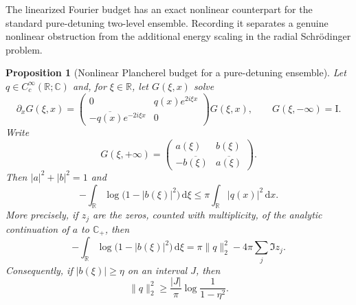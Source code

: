 \documentclass[11pt]{article}
\newcommand{\Id}{\mathrm I}
\newcommand{\dd}{\,\mathrm d}
\newtheorem{proposition}[theorem]{Proposition}
\theoremstyle{definition}
\theoremstyle{remark}
\begin{document}
The linearized Fourier budget has an exact nonlinear counterpart for the
standard pure-detuning two-level ensemble.  Recording it separates a genuine
nonlinear obstruction from the additional energy scaling in the radial
Schr\"odinger problem.

\begin{proposition}[Nonlinear Plancherel budget for a pure-detuning ensemble]
\label{prop:SU2-nonlinear-Plancherel}
Let $q\in C_c^\infty(\mathbb R;\mathbb C)$ and, for $\xi\in\mathbb R$, let
$G(\xi,x)$ solve
\begin{equation}
 \partial_xG(\xi,x)=
 \begin{pmatrix}
 0&q(x)e^{2i\xi x}\\
 -\overline{q(x)}e^{-2i\xi x}&0
 \end{pmatrix}G(\xi,x),
 \qquad G(\xi,-\infty)=\Id.
 \label{eq:SU2-nonlinear-Fourier-system}
\end{equation}
Write
\begin{equation}
 G(\xi,+\infty)=
 \begin{pmatrix}a(\xi)&b(\xi)\\
 -\overline{b(\xi)}&\overline{a(\xi)}
 \end{pmatrix}.
\end{equation}
Then $|a|^2+|b|^2=1$ and
\begin{equation}
 -\int_{\mathbb R}\log\bigl(1-|b(\xi)|^2\bigr)\dd\xi
 \leq \pi\int_{\mathbb R}|q(x)|^2\dd x.
 \label{eq:SU2-nonlinear-Plancherel}
\end{equation}
More precisely, if $z_j$ are the zeros, counted with multiplicity, of the
analytic continuation of $a$ to $\mathbb C_+$, then
\begin{equation}
 -\int_{\mathbb R}\log\bigl(1-|b(\xi)|^2\bigr)\dd\xi
 =\pi\|q\|_2^2-4\pi\sum_j\Im z_j.
 \label{eq:SU2-trace-with-zeros}
\end{equation}
Consequently, if $|b(\xi)|\geq\eta$ on an interval $J$, then
\begin{equation}
 \|q\|_2^2\geq
 \frac{|J|}{\pi}\log\frac1{1-\eta^2}.
 \label{eq:SU2-fixed-band-cost}
\end{equation}
\end{proposition}
\end{document}
